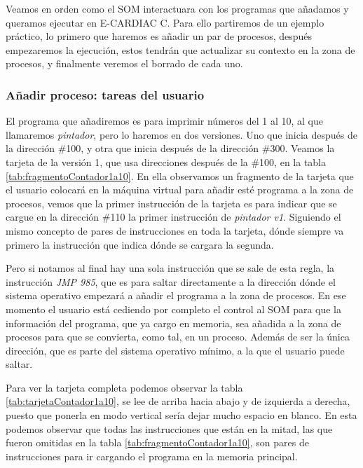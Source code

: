 \documentclass[letterpaper,12pt,oneside]{book}
\begin{document}
        Veamos en orden como el SOM interactuara con los programas que añadamos y queramos ejecutar en E-CARDIAC C. Para ello partiremos
		de un ejemplo práctico, lo primero que haremos es añadir un par de procesos, después empezaremos la ejecución, estos tendrán que actualizar
		su contexto en la zona de procesos, y finalmente veremos el borrado de cada uno.
  
		\subsubsection{Añadir proceso: tareas del usuario }
		
			
		El programa que añadiremos es para imprimir números del 1 al 10, al que llamaremos \textit{pintador}, pero lo haremos en dos versiones. Uno que inicia después de la 		
		dirección \#100, y otra que inicia
		después de la dirección \#300. Veamos la tarjeta de la versión 1, que usa direcciones después de la \#100, en la tabla \ref{tab:fragmentoContador1a10}. En ella observamos 
		un fragmento de la tarjeta que el usuario colocará en la máquina virtual para añadir esté programa a la zona de procesos, vemos que la primer instrucción de la tarjeta  es para indicar que se cargue 
		en la dirección \#110 la primer instrucción de \textit{pintador v1}. Siguiendo el mismo concepto de pares de instrucciones en toda la tarjeta, dónde siempre
		va primero la instrucción que indica dónde se cargara la segunda.
  
        Pero
		si notamos al final hay una sola instrucción que se sale de esta regla,
        la instrucción \textit{JMP 985}, que es para saltar directamente a la dirección
		dónde el sistema operativo empezará a añadir el programa a la zona de procesos. En ese momento el usuario está cediendo por completo el control
		al SOM para que la información del programa, que ya cargo en memoria, sea añadida a la zona de procesos para que se convierta, como tal, en un proceso. Además de ser la única dirección, que es parte del sistema operativo mínimo, a la que el usuario puede saltar.
		
		Para ver la tarjeta completa podemos observar la tabla \ref{tab:tarjetaContador1a10}, se lee de arriba hacia abajo y de
		izquierda a derecha, puesto que ponerla en modo vertical sería dejar mucho espacio en blanco. En esta podemos observar que todas las instrucciones
		que están en la mitad, las que fueron omitidas en la tabla \ref{tab:fragmentoContador1a10}, son pares de instrucciones para ir cargando el programa
		en la memoria principal.
				
\end{document}
